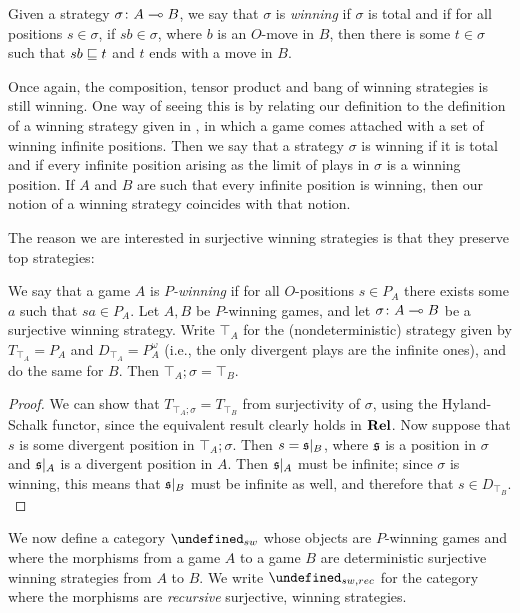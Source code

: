 \documentclass[sigplan,10pt,review]{acmart}\settopmatter{printfolios=true,printccs=false,printacmref=false}
\let\G\undefined
\begin{document}
Given a strategy $\sigma\colon A\multimap B$, we say that $\sigma$ is \emph{winning} if $\sigma$ is total and if for all positions $s\in\sigma$, if $sb\in\sigma$, where $b$ is an $O$-move in $B$, then there is some $t\in\sigma$ such that $sb\sqsubseteq t$ and $t$ ends with a move in $B$.  

Once again, the composition, tensor product and bang of winning strategies is still winning.  
One way of seeing this is by relating our definition to the definition of a winning strategy given in \cite{abramskyjagadeesangames}, in which a game comes attached with a set of winning infinite positions.  
Then we say that a strategy $\sigma$ is winning if it is total and if every infinite position arising as the limit of plays in $\sigma$ is a winning position.  
If $A$ and $B$ are such that every infinite position is winning, then our notion of a winning strategy coincides with that notion.  

The reason we are interested in surjective winning strategies is that they preserve top strategies:

\begin{lemma}
  We say that a game $A$ is \emph{$P$-winning} if for all $O$-positions $s\in P_A$ there exists some $a$ such that $sa\in P_A$.  
  Let $A,B$ be $P$-winning games, and let $\sigma\colon A\multimap B$ be a surjective winning strategy.  
  Write $\top_A$ for the (nondeterministic) strategy given by $T_{\top_A}=P_A$ and $D_{\top_A}=P_A^\omega$ (i.e., the only divergent plays are the infinite ones), and do the same for $B$.
  Then $\top_A;\sigma=\top_B$.  
\end{lemma}
\begin{proof}
  We can show that $T_{\top_A;\sigma}=T_{\top_B}$ from surjectivity of $\sigma$, using the Hyland-Schalk functor, since the equivalent result clearly holds in ${\normalfont\textbf{Rel}}$.  
  Now suppose that $s$ is some divergent position in $\top_A;\sigma$.  
  Then $s=\mathfrak s\vert_B$, where $\mathfrak s$ is a position in $\sigma$ and $\mathfrak s\vert_A$ is a divergent position in $A$.
  Then $\mathfrak s\vert_A$ must be infinite; since $\sigma$ is winning, this means that $\mathfrak s\vert_B$ must be infinite as well, and therefore that $s\in D_{\top_B}$.  
  \label{lem:sw}
\end{proof}

We now define a category $\G_{sw}$ whose objects are $P$-winning games and where the morphisms from a game $A$ to a game $B$ are deterministic surjective winning strategies from $A$ to $B$.  
We write $\G_{sw,rec}$ for the category where the morphisms are \emph{recursive} surjective, winning strategies.  
\end{document}
